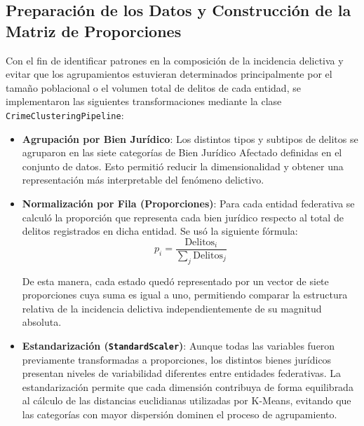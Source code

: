 \subsection{Preparación de los Datos y Construcción de la Matriz de Proporciones}

Con el fin de identificar patrones en la composición de la incidencia delictiva y evitar que los agrupamientos
estuvieran determinados principalmente por el tamaño poblacional o el volumen total de delitos de cada entidad,
se implementaron las siguientes transformaciones mediante la clase \texttt{CrimeClusteringPipeline}:

\begin{itemize}
  \item \textbf{Agrupación por Bien Jurídico}: Los distintos tipos y subtipos de delitos se agruparon en las siete categorías de
  Bien Jurídico Afectado definidas en el conjunto de datos. Esto permitió reducir la dimensionalidad y obtener una
  representación más interpretable del fenómeno delictivo.

  \item \textbf{Normalización por Fila (Proporciones)}: Para cada entidad federativa se calculó la proporción que representa
  cada bien jurídico respecto al total de delitos registrados en dicha entidad. Se usó la siguiente fórmula:
  \[
    p_i = \frac{\mathrm{Delitos}_i}{\sum_j \mathrm{Delitos}_j}
  \]

  De esta manera, cada estado quedó representado por un vector de siete proporciones cuya suma es igual a uno,
  permitiendo comparar la estructura relativa de la incidencia delictiva independientemente de su magnitud absoluta.

  \item \textbf{Estandarización (\texttt{StandardScaler})}: Aunque todas las variables fueron previamente transformadas a proporciones,
  los distintos bienes jurídicos presentan niveles de variabilidad diferentes entre entidades federativas. La
  estandarización permite que cada dimensión contribuya de forma equilibrada al cálculo de las distancias euclidianas
  utilizadas por K-Means, evitando que las categorías con mayor dispersión dominen el proceso de agrupamiento.
\end{itemize}


